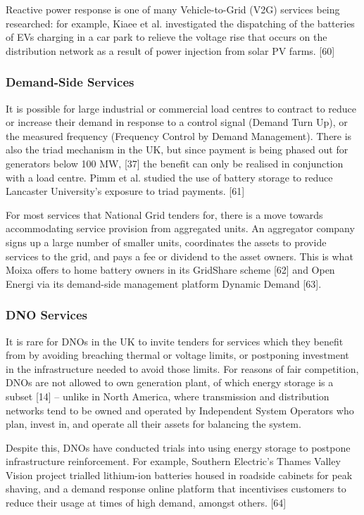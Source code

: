 \documentclass[report_18month.tex]{subfiles}
\begin{document}
Reactive power response is one of many Vehicle-to-Grid (V2G) services being researched: for example, Kiaee et al. investigated the dispatching of the batteries of EVs charging in a car park to relieve the voltage rise that occurs on the distribution network as a result of power injection from solar PV farms. [60]

\subsubsection{Demand-Side Services}
It is possible for large industrial or commercial load centres to contract to reduce or increase their demand in response to a control signal (Demand Turn Up), or the measured frequency (Frequency Control by Demand Management). There is also the triad mechanism in the UK, but since payment is being phased out for generators below 100 MW, [37] the benefit can only be realised in conjunction with a load centre. Pimm et al. studied the use of battery storage to reduce Lancaster University’s exposure to triad payments. [61]

For most services that National Grid tenders for, there is a move towards accommodating service provision from aggregated units. An aggregator company signs up a large number of smaller units, coordinates the assets to provide services to the grid, and pays a fee or dividend to the asset owners. This is what Moixa offers to home battery owners in its GridShare scheme [62] and Open Energi via its demand-side management platform Dynamic Demand [63].

\subsubsection{DNO Services}
It is rare for DNOs in the UK to invite tenders for services which they benefit from by avoiding breaching thermal or voltage limits, or postponing investment in the infrastructure needed to avoid those limits. For reasons of fair competition, DNOs are not allowed to own generation plant, of which energy storage is a subset [14] – unlike in North America, where transmission and distribution networks tend to be owned and operated by Independent System Operators who plan, invest in, and operate all their assets for balancing the system.

Despite this, DNOs have conducted trials into using energy storage to postpone infrastructure reinforcement. For example, Southern Electric’s Thames Valley Vision project trialled lithium-ion batteries housed in roadside cabinets for peak shaving, and a demand response online platform that incentivises customers to reduce their usage at times of high demand, amongst others. [64]
\end{document}
